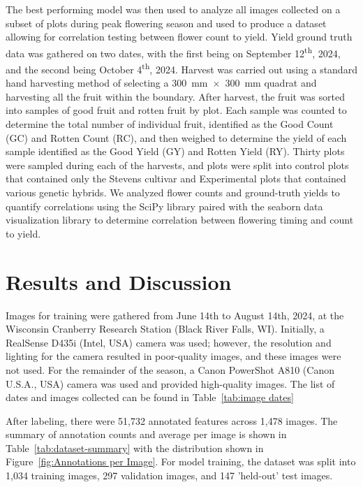 The best performing model was then used to analyze all images collected on a subset of plots during peak flowering season and used to produce a dataset allowing for correlation testing between flower count to yield. Yield ground truth data was gathered on two dates, with the first being on September 12\textsuperscript{th}, 2024, and the second being October 4\textsuperscript{th}, 2024. Harvest was carried out using a standard hand harvesting method of selecting a 300~mm~$\times$~300~mm quadrat and harvesting all the fruit within the boundary. After harvest, the fruit was sorted into samples of good fruit and rotten fruit by plot. Each sample was counted to determine the total number of individual fruit, identified as the Good Count (GC) and Rotten Count (RC), and then weighed to determine the yield of each sample identified as the Good Yield (GY) and Rotten Yield (RY). Thirty plots were sampled during each of the harvests, and plots were split into control plots that contained only the Stevens cultivar and Experimental plots that contained various genetic hybrids. We analyzed flower counts and ground-truth yields to quantify correlations using the SciPy library \cite{virtanen_scipy_2020} paired with the seaborn data visualization library \cite{waskom_seaborn_2021} to determine correlation between flowering timing and count to yield.


\section{Results and Discussion}

Images for training were gathered from June 14th to August 14th, 2024, at the Wisconsin Cranberry Research Station (Black River Falls, WI). Initially, a RealSense D435i (Intel, USA) camera was used; however, the resolution and lighting for the camera resulted in poor-quality images, and these images were not used. For the remainder of the season, a Canon PowerShot A810 (Canon U.S.A., USA) camera was used and provided high-quality images. The list of dates and images collected can be found in Table~\ref{tab:image dates}



After labeling, there were 51,732 annotated features across 1,478 images. The summary of annotation counts and average per image is shown in Table~\ref{tab:dataset-summary} with the distribution shown in Figure~\ref{fig:Annotations per Image}. For model training, the dataset was split into 1,034 training images, 297 validation images, and 147 'held-out' test images.

